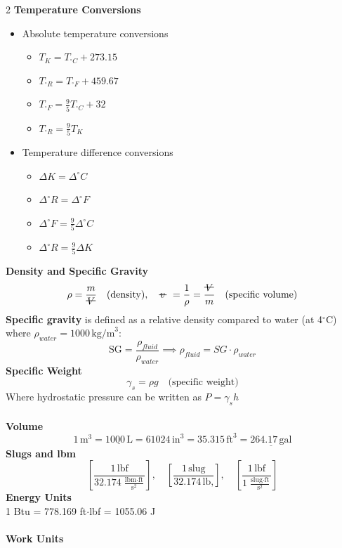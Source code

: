 \documentclass[10pt, fleqn]{article}
\newcommand{\vol}{\mathord{\text{\ooalign{\hidewidth $V$\hidewidth\cr\kern-0.5pt\raisebox{0.8ex}{\rule[0pt]{1em}{0.5pt}}}}}}
\newcommand{\svol}{%
  \mathord{\text{\ooalign{%
    \hspace{0.1em}$v$\cr         %
    \hspace{-0.02em}\rule[0.6ex]{0.8em}{0.5pt} %
  }}}%
}
\begin{document}
\begin{multicols}{2}
\textbf{Temperature Conversions}
\begin{itemize}[label=\textbullet]
    \item Absolute temperature conversions
    \begin{itemize}[label=\textopenbullet]
        \item $T_{K} = T_{^\circ C} + 273.15$
        \item $T_{^\circ R} = T_{^\circ F} + 459.67$
        \item $T_{^\circ F} = \frac{9}{5}T_{^\circ C} + 32$
        \item $T_{^\circ R} = \frac{9}{5}T_{K}$
    \end{itemize}
    \item Temperature difference conversions
    \begin{itemize}[label=\textopenbullet]
        \item $\Delta K = \Delta ^\circ C$
        \item $\Delta ^\circ R = \Delta ^\circ F$
        \item $\Delta ^\circ F = \frac{9}{5}\Delta ^\circ C$
        \item $\Delta ^\circ R = \frac{9}{5}\Delta K$
    \end{itemize}
\end{itemize}
\textbf{Density and Specific Gravity}
\[\rho = \frac{m}{\vol}\quad \text{(density)}, \quad \svol = \frac{1}{\rho} = \frac{\vol}{m}  \quad \text{(specific volume)}\]
\textbf{Specific gravity} is defined as a relative density compared to water (at 4$^\circ$C) where $\rho_{water} = 1000\,\text{kg/m}^3$:
\[\text{SG} = \frac{\rho_{fluid}}{\rho_{water}} \implies \rho_{fluid} = SG \cdot \rho_{water}\]
\textbf{Specific Weight}
\[\gamma_s = \rho g \quad \text{(specific weight)}\]
Where hydrostatic pressure can be written as $P = \gamma_s h$\\\\
\textbf{Volume}
\[1\,\text{m}^3 = \underline{1000\,\text{L}} = 61024\,\text{in}^3 = 35.315\,\text{ft}^3=\underline{264.17\,\text{gal}}\]
\textbf{Slugs and lbm}
\[\left[\frac{1\,\text{lbf}}{32.174\,\frac{\text{lbm}\cdot\text{ft}}{\text{s}^2}}\right],\quad
\left[\frac{1\,\text{slug}}{32.174\,\text{lb,}}\right], \quad
\left[\frac{1\,\text{lbf}}{1\,\frac{\text{slug}\cdot\text{ft}}{\text{s}^2}}\right]\]
\textbf{Energy Units}\\
1 Btu = 778.169 ft$\cdot$lbf = 1055.06 J\\\\
\textbf{Work Units}\\

\end{multicols}
\end{document}
